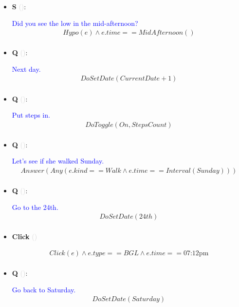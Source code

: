 \documentclass[11pt]{article}
\newcounter{CQ}
\newcounter{CS}
\newcounter{CClick}
\newcommand{\key}[1]{\textcolor{lightgray}{#1}}
\begin{document}
\begin{itemize}
	
	\item
	\textbf{S\theCS} \key{()}: \addtocounter{CS}{1}
	\textcolor{blue}{ Did you see the low in the mid-afternoon? }
	\begin{multline*}
	Hypo(e) \wedge e.time == MidAfternoon() \\
	\end{multline*}
	 
	
	\item
	\textbf{Q\theCQ} \key{()}: \addtocounter{CQ}{1}
	\textcolor{blue}{ Next day. }
	\begin{multline*}
	DoSetDate(CurrentDate + 1) \\
	\end{multline*}
	
	
	
	\item
	\textbf{Q\theCQ} \key{()}: \addtocounter{CQ}{1}
	\textcolor{blue}{ Put steps in. }
	\begin{multline*}
	DoToggle(On, StepsCount) \\
	\end{multline*}
	
	
	\item
	\textbf{Q\theCQ} \key{()}: \addtocounter{CQ}{1}
	\textcolor{blue}{ Let's see if she walked Sunday.  }
	\begin{multline*}
	Answer(Any(e.kind==Walk \wedge e.time==Interval(Sunday))) \\
	\end{multline*}
	
	\item
	\textbf{Q\theCQ} \key{()}: \addtocounter{CQ}{1}
	\textcolor{blue}{ Go to the 24th. }
	\begin{multline*}
	DoSetDate(24th) \\
	\end{multline*}
	 
	
	\item
	\textbf{Click\theCClick} \key{()} \addtocounter{CClick}{1}
	\begin{multline*}
	Click(e) \wedge e.type == BGL \wedge e.time == \mbox{07:12pm} \\
	\end{multline*}
	
	
	\item
	\textbf{Q\theCQ} \key{()}: \addtocounter{CQ}{1}
	\textcolor{blue}{ Go back to Saturday. }
	\begin{multline*}
	DoSetDate(Saturday) \\
	\end{multline*}
	

\end{itemize}
\end{document}
